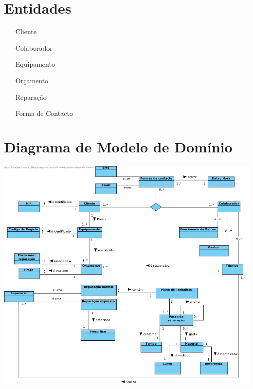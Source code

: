 \documentclass[a4paper,12pt]{scrreprt}
\begin{document}
\section{Entidades}

\begin{itemize}
        \item[Cliente]{} %
        \item[Colaborador] {} %
        \item[Equipamento] {} %
        \item[Orçamento] {}
        \item[Reparação] {} %
        \item[Forma de Contacto] {}
\end{itemize}






\section{Diagrama de Modelo de Domínio} %

\includegraphics[scale=0.41]{Modelo.jpg}
\end{document}
